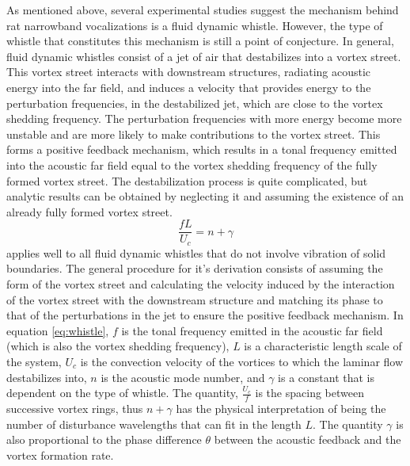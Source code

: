 As mentioned above, several experimental studies suggest the mechanism behind rat narrowband vocalizations is a fluid dynamic whistle. However, the type of whistle that constitutes this mechanism is still a point of conjecture. In general, fluid dynamic whistles consist of a jet of air that destabilizes into a vortex street. This vortex street interacts with downstream structures, radiating acoustic energy into the far field, and induces a velocity that provides energy to the perturbation frequencies, in the destabilized jet, which are close to the vortex shedding frequency. The perturbation frequencies with more energy become more unstable and are more likely to make contributions to the vortex street. This forms a positive feedback mechanism, which results in a tonal frequency emitted into the acoustic far field equal to the vortex shedding frequency of the fully formed vortex street. The destabilization process is quite complicated, but analytic results can be obtained by neglecting it and assuming the existence of an already fully formed vortex street.
\begin{equation}
\label{eq:whistle}
\frac{fL}{U_{c}}=n+\gamma
\end{equation}
applies well to all fluid dynamic whistles that do not involve vibration of solid boundaries. The general procedure for it's derivation consists of assuming the form of the vortex street and calculating the velocity induced by the interaction of the vortex street with the downstream structure and matching its phase to that of the perturbations in the jet to ensure the positive feedback mechanism. In equation \ref{eq:whistle}, $f$ is the tonal frequency emitted in the acoustic far field (which is also the vortex shedding frequency), $L$ is a characteristic length scale of the system, $U_c$ is the convection velocity of the vortices to which the laminar flow destabilizes into, $n$ is the acoustic mode number, and $\gamma$ is a constant that is dependent on the type of whistle. The quantity, $\frac{U_c}{f}$ is the spacing between successive vortex rings, thus $n+\gamma$ has the physical interpretation of being the number of disturbance wavelengths that can fit in the length $L$. The quantity $\gamma$ is also proportional to the phase difference $\theta$ between the acoustic feedback and the vortex formation rate.


